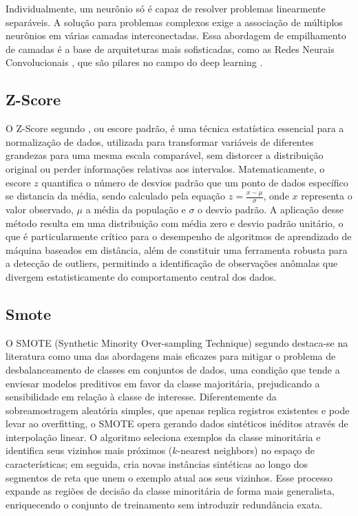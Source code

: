 Individualmente, um neurônio só é capaz de resolver problemas linearmente separáveis. A solução para problemas complexos exige a associação de múltiplos neurônios em várias camadas interconectadas. Essa abordagem de empilhamento de camadas é a base de arquiteturas mais sofisticadas, como as Redes Neurais Convolucionais \cite{Abraham2005}, que são pilares no campo do deep learning \cite{LeCun2015}.

\subsection{Z-Score}
O Z-Score segundo \cite{doi:10.1177/02537176211046525}, ou escore padrão, é uma técnica estatística essencial para a normalização de dados, utilizada para transformar variáveis de diferentes grandezas para uma mesma escala comparável, sem distorcer a distribuição original ou perder informações relativas aos intervalos. Matematicamente, o escore $z$ quantifica o número de desvios padrão que um ponto de dados específico se distancia da média, sendo calculado pela equação $z = \frac{x - \mu}{\sigma}$, onde $x$ representa o valor observado, $\mu$ a média da população e $\sigma$ o desvio padrão. A aplicação desse método resulta em uma distribuição com média zero e desvio padrão unitário, o que é particularmente crítico para o desempenho de algoritmos de aprendizado de máquina baseados em distância, além de constituir uma ferramenta robusta para a detecção de outliers, permitindo a identificação de observações anômalas que divergem estatisticamente do comportamento central dos dados.

\subsection{Smote}
O SMOTE (Synthetic Minority Over-sampling Technique) segundo \cite{rs11243040} destaca-se na literatura como uma das abordagens mais eficazes para mitigar o problema de desbalanceamento de classes em conjuntos de dados, uma condição que tende a enviesar modelos preditivos em favor da classe majoritária, prejudicando a sensibilidade em relação à classe de interesse. Diferentemente da sobreamostragem aleatória simples, que apenas replica registros existentes e pode levar ao overfitting, o SMOTE opera gerando dados sintéticos inéditos através de interpolação linear. O algoritmo seleciona exemplos da classe minoritária e identifica seus vizinhos mais próximos ($k$-nearest neighbors) no espaço de características; em seguida, cria novas instâncias sintéticas ao longo dos segmentos de reta que unem o exemplo atual aos seus vizinhos. Esse processo expande as regiões de decisão da classe minoritária de forma mais generalista, enriquecendo o conjunto de treinamento sem introduzir redundância exata.

